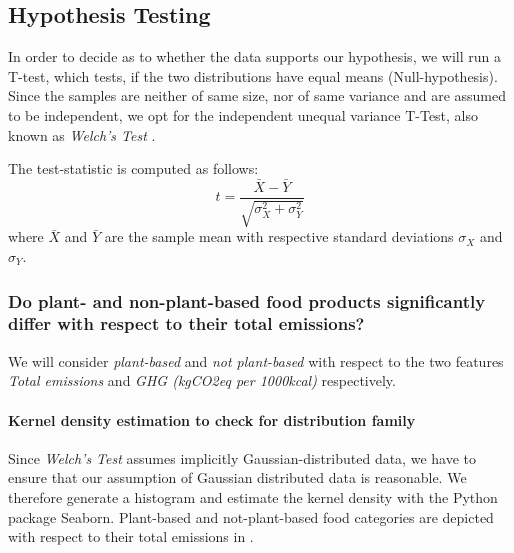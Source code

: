 \documentclass{article}
\begin{document}
\subsection*{Hypothesis Testing}
In order  to decide as to whether the data supports our hypothesis, we will run a T-test, which tests, if the two distributions have equal means (Null-hypothesis).  Since the samples are neither of same size, nor of same variance and are assumed to be independent, we opt for the independent unequal variance T-Test, also known as \textit{Welch's Test} \cite{Welch1947}. 



The test-statistic is computed as follows:
\begin{equation}\label{eq:t-test}
  t = \frac{\bar{X}-\bar{Y}}{\sqrt{\sigma^2_{X}+\sigma^2_{Y}}}
\end{equation}
where $\bar{X}$ and  $\bar{Y}$ are the sample mean with respective standard deviations $\sigma_{X}$ and $\sigma_{Y}$.

\subsubsection*{Do plant- and non-plant-based food products significantly differ with respect to their total emissions?}


 We will consider \textit{plant-based} and \textit{not plant-based} with respect to  the two features \textit{Total emissions} and \textit{GHG (kgCO2eq per 1000kcal)} respectively.
\paragraph*{Kernel density estimation to check for distribution family} Since \textit{Welch's Test} assumes implicitly Gaussian-distributed data, we have to ensure that our assumption of Gaussian distributed data is reasonable.  We therefore generate a histogram and estimate the kernel density with the Python package Seaborn. \cite{Seaborn} Plant-based and not-plant-based food categories are depicted with respect to their total emissions in .
\end{document}
